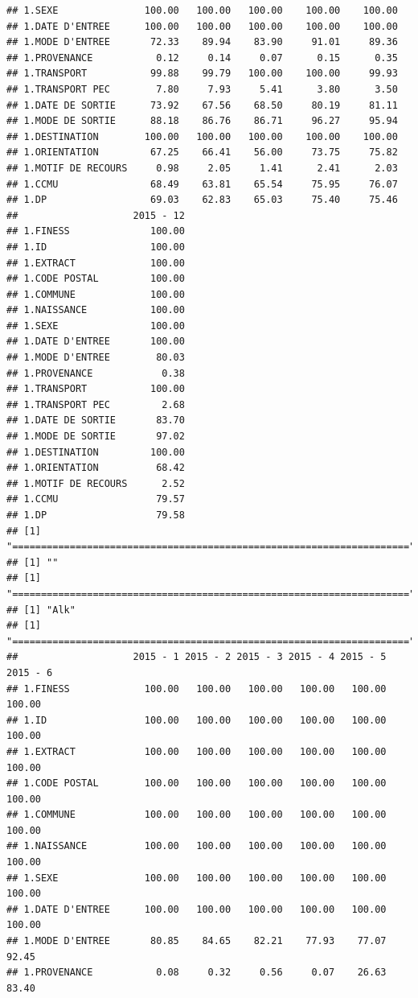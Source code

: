 \documentclass[]{article}
\begin{document}
\begin{verbatim}
## 1.SEXE               100.00   100.00   100.00    100.00    100.00
## 1.DATE D'ENTREE      100.00   100.00   100.00    100.00    100.00
## 1.MODE D'ENTREE       72.33    89.94    83.90     91.01     89.36
## 1.PROVENANCE           0.12     0.14     0.07      0.15      0.35
## 1.TRANSPORT           99.88    99.79   100.00    100.00     99.93
## 1.TRANSPORT PEC        7.80     7.93     5.41      3.80      3.50
## 1.DATE DE SORTIE      73.92    67.56    68.50     80.19     81.11
## 1.MODE DE SORTIE      88.18    86.76    86.71     96.27     95.94
## 1.DESTINATION        100.00   100.00   100.00    100.00    100.00
## 1.ORIENTATION         67.25    66.41    56.00     73.75     75.82
## 1.MOTIF DE RECOURS     0.98     2.05     1.41      2.41      2.03
## 1.CCMU                68.49    63.81    65.54     75.95     76.07
## 1.DP                  69.03    62.83    65.03     75.40     75.46
##                    2015 - 12
## 1.FINESS              100.00
## 1.ID                  100.00
## 1.EXTRACT             100.00
## 1.CODE POSTAL         100.00
## 1.COMMUNE             100.00
## 1.NAISSANCE           100.00
## 1.SEXE                100.00
## 1.DATE D'ENTREE       100.00
## 1.MODE D'ENTREE        80.03
## 1.PROVENANCE            0.38
## 1.TRANSPORT           100.00
## 1.TRANSPORT PEC         2.68
## 1.DATE DE SORTIE       83.70
## 1.MODE DE SORTIE       97.02
## 1.DESTINATION         100.00
## 1.ORIENTATION          68.42
## 1.MOTIF DE RECOURS      2.52
## 1.CCMU                 79.57
## 1.DP                   79.58
## [1] "====================================================================="
## [1] ""
## [1] "====================================================================="
## [1] "Alk"
## [1] "====================================================================="
##                    2015 - 1 2015 - 2 2015 - 3 2015 - 4 2015 - 5 2015 - 6
## 1.FINESS             100.00   100.00   100.00   100.00   100.00   100.00
## 1.ID                 100.00   100.00   100.00   100.00   100.00   100.00
## 1.EXTRACT            100.00   100.00   100.00   100.00   100.00   100.00
## 1.CODE POSTAL        100.00   100.00   100.00   100.00   100.00   100.00
## 1.COMMUNE            100.00   100.00   100.00   100.00   100.00   100.00
## 1.NAISSANCE          100.00   100.00   100.00   100.00   100.00   100.00
## 1.SEXE               100.00   100.00   100.00   100.00   100.00   100.00
## 1.DATE D'ENTREE      100.00   100.00   100.00   100.00   100.00   100.00
## 1.MODE D'ENTREE       80.85    84.65    82.21    77.93    77.07    92.45
## 1.PROVENANCE           0.08     0.32     0.56     0.07    26.63    83.40

\end{verbatim}
\end{document}
